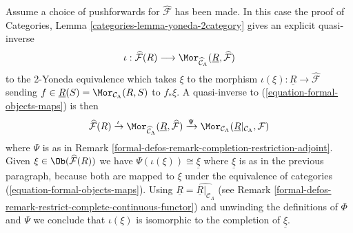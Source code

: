 \begin{remark}
\medskip\noindent
Assume a choice of pushforwards for $\widehat{\mathcal{F}}$ has been made.
In this case the proof of
Categories, Lemma \ref{categories-lemma-yoneda-2category}
gives an explicit quasi-inverse
$$
\iota :
\widehat{\mathcal{F}}(R) \longrightarrow
\Mor_{\widehat{\mathcal{C}}_\Lambda}(
\underline{R}, \widehat{\mathcal{F}})
$$
to the 2-Yoneda equivalence which takes $\xi$ to the morphism
$\iota(\xi) : \underline{R} \to \widehat{\mathcal{F}}$ sending
$f \in \underline{R}(S) = \Mor_{\mathcal{C}_\Lambda}(R, S)$
to $f_*\xi$. A quasi-inverse to (\ref{equation-formal-objects-maps})
is then
$$
\widehat{\mathcal{F}}(R)
\xrightarrow{\iota}
\Mor_{\widehat{\mathcal{C}}_\Lambda}(
\underline{R}, \widehat{\mathcal{F}})
\xrightarrow{\Psi}
\Mor_{\mathcal{C}_\Lambda}(
\underline{R}|_{\mathcal{C}_\Lambda}, \mathcal{F})
$$
where $\Psi$ is as in
Remark \ref{formal-defos-remark-completion-restriction-adjoint}.
Given $\xi \in \Ob(\widehat{\mathcal{F}}(R))$ we have
$\Psi(\iota(\xi)) \cong \underline{\xi}$ where $\underline{\xi}$
is as in the previous paragraph, because both are mapped to $\xi$
under the equivalence of categories (\ref{equation-formal-objects-maps}).
Using $\underline{R} = \widehat{\underline{R}|_{\mathcal{C}_\Lambda}}$
(see Remark \ref{formal-defos-remark-restrict-complete-continuous-functor})
and unwinding the definitions of $\Phi$ and $\Psi$ we conclude that
$\iota(\xi)$ is isomorphic to the completion of $\underline{\xi}$.
\end{remark}


